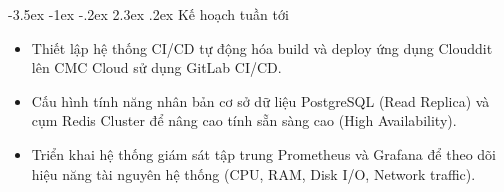 \documentclass[12pt,a4paper]{article}
\makeatletter
\renewcommand\section{\@startsection {section}{1}{\z@}%
                                   {-3.5ex \@plus -1ex \@minus -.2ex}%
                                   {2.3ex \@plus.2ex}%
                                   {\normalfont\Large\bfseries\color{cmcblue}}}
\makeatother
\begin{document}
\section{Kế hoạch tuần tới}

\begin{itemize}
  \item Thiết lập hệ thống CI/CD tự động hóa build và deploy ứng dụng Clouddit lên CMC Cloud sử dụng GitLab CI/CD.
  \item Cấu hình tính năng nhân bản cơ sở dữ liệu PostgreSQL (Read Replica) và cụm Redis Cluster để nâng cao tính sẵn sàng cao (High Availability).
  \item Triển khai hệ thống giám sát tập trung Prometheus và Grafana để theo dõi hiệu năng tài nguyên hệ thống (CPU, RAM, Disk I/O, Network traffic).
\end{itemize}
\end{document}

